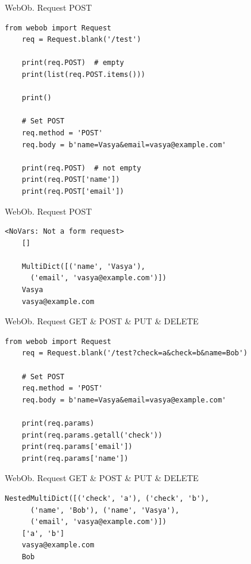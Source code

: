 \begin{frame}[fragile]{WebOb. Request POST}

  \begin{lstlisting}[style=python]
    from webob import Request
    req = Request.blank('/test')

    print(req.POST)  # empty
    print(list(req.POST.items()))

    print()

    # Set POST
    req.method = 'POST'
    req.body = b'name=Vasya&email=vasya@example.com'

    print(req.POST)  # not empty
    print(req.POST['name'])
    print(req.POST['email'])
  \end{lstlisting}

\end{frame}

\begin{frame}[fragile]{WebOb. Request POST}

  \begin{lstlisting}[style=python]
    <NoVars: Not a form request>
    []

    MultiDict([('name', 'Vasya'),
      ('email', 'vasya@example.com')])
    Vasya
    vasya@example.com
  \end{lstlisting}

\end{frame}

\begin{frame}[fragile]{WebOb. Request GET \& POST \& PUT \& DELETE}

  \begin{lstlisting}[style=python]
    from webob import Request
    req = Request.blank('/test?check=a&check=b&name=Bob')

    # Set POST
    req.method = 'POST'
    req.body = b'name=Vasya&email=vasya@example.com'

    print(req.params)
    print(req.params.getall('check'))
    print(req.params['email'])
    print(req.params['name'])
  \end{lstlisting}

\end{frame}



\begin{frame}[fragile]{WebOb. Request GET \& POST \& PUT \& DELETE}

  \begin{lstlisting}[style=python]
    NestedMultiDict([('check', 'a'), ('check', 'b'),
      ('name', 'Bob'), ('name', 'Vasya'),
      ('email', 'vasya@example.com')])
    ['a', 'b']
    vasya@example.com
    Bob
  \end{lstlisting}

\end{frame}

